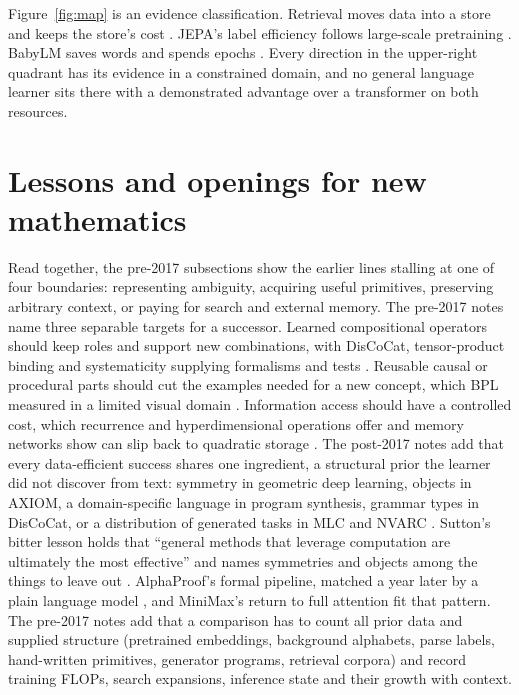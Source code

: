 Figure~\ref{fig:map} is an evidence classification. Retrieval moves data into a store and keeps the store's cost \cite{post18,post19}. JEPA's label efficiency follows large-scale pretraining \cite{post28}. BabyLM saves words and spends epochs \cite{post81}. Every direction in the upper-right quadrant has its evidence in a constrained domain, and no general language learner sits there with a demonstrated advantage over a transformer on both resources.

\section{Lessons and openings for new mathematics}
Read together, the pre-2017 subsections show the earlier lines stalling at one of four boundaries: representing ambiguity, acquiring useful primitives, preserving arbitrary context, or paying for search and external memory. The pre-2017 notes name three separable targets for a successor. Learned compositional operators should keep roles and support new combinations, with DisCoCat, tensor-product binding and systematicity supplying formalisms and tests \cite{pre25,pre27,pre41}. Reusable causal or procedural parts should cut the examples needed for a new concept, which BPL measured in a limited visual domain \cite{pre37}. Information access should have a controlled cost, which recurrence and hyperdimensional operations offer and memory networks show can slip back to quadratic storage \cite{pre34}. The post-2017 notes add that every data-efficient success shares one ingredient, a structural prior the learner did not discover from text: symmetry in geometric deep learning, objects in AXIOM, a domain-specific language in program synthesis, grammar types in DisCoCat, or a distribution of generated tasks in MLC and NVARC \cite{post70,post47,post49,post68,post65,post53}. Sutton's bitter lesson holds that ``general methods that leverage computation are ultimately the most effective'' and names symmetries and objects among the things to leave out \cite{post106}. AlphaProof's formal pipeline, matched a year later by a plain language model \cite{post62}, and MiniMax's return to full attention \cite{post14} fit that pattern. The pre-2017 notes add that a comparison has to count all prior data and supplied structure (pretrained embeddings, background alphabets, parse labels, hand-written primitives, generator programs, retrieval corpora) and record training FLOPs, search expansions, inference state and their growth with context.

